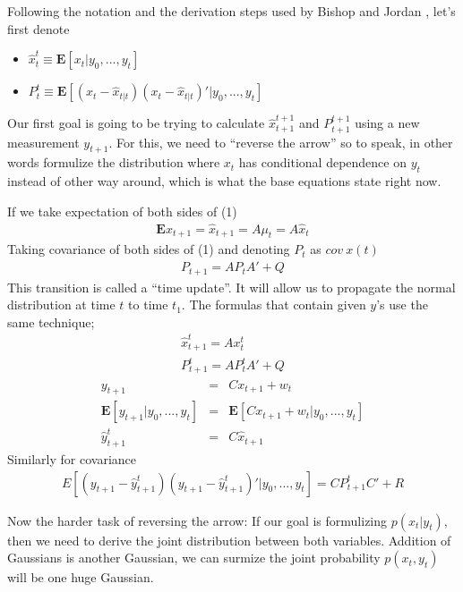Following the notation and the derivation steps used by Bishop and Jordan
\cite{jordan}, let's first denote

\begin{itemize}
   \item $\hat{x}_{t}^t \equiv \mathbf{E}[x_t|y_0,...,y_t]$
   \item $P_{t}^t \equiv \mathbf{E}[(x_t - \hat{x}_{t|t})(x_t -
   \hat{x}_{t|t})'|y_0,...,y_t]$ 
\end{itemize}
Our first goal is going to be trying to calculate $\hat{x}_{t+1}^{t+1}$ and
$P_{t+1}^{t+1}$ using a new measurement $y_{t+1}$. For this, we need to
``reverse the arrow'' so to speak, in other words formulize the distribution
where $x_t$ has conditional dependence on $y_t$ instead of other way around,
which is what the base equations state right now.

If we take expectation of both sides of (1)
\begin{eqnarray*}
\mathbf{E}x_{t+1} = \hat{x}_{t+1} = A\mu_t = A\hat{x}_t
\end{eqnarray*}
Taking covariance of both sides of (1) and denoting $P_t$ as $cov \: x(t)$
\begin{eqnarray*}
P_{t+1} = AP_{t}A' + Q
\end{eqnarray*}
This transition is called a ``time update''. It will allow us to propagate the
normal distribution at time $t$ to time $t_1$. The formulas that contain given
$y$'s use the same technique;
\begin{eqnarray*}
\hat{x}_{t+1}^t = Ax_{t}^t\\
P_{t+1}^t = AP_{t}^tA' + Q
\end{eqnarray*}
\begin{eqnarray*}
y_{t+1} &=& Cx_{t+1} + w_t\\
\mathbf{E}[y_{t+1}|y_0,...,y_t] &=& \mathbf{E}[Cx_{t+1}+w_t|y_0,...,y_t]\\
\hat{y}_{t+1}^t &=& C\hat{x}_{t+1}
\end{eqnarray*}
Similarly for covariance
\begin{eqnarray*}
E[(y_{t+1}-\hat{y}_{t+1}^t)(y_{t+1}-\hat{y}_{t+1}^t)'|y_0,...,y_t] =
CP_{t+1}^tC' + R
\end{eqnarray*}

Now the harder task of reversing the arrow: If our goal is formulizing
$p(x_t|y_t)$, then we need to derive the joint distribution between both
variables. Addition of Gaussians is another Gaussian, we can surmize the joint
probability $p(x_t,y_t)$ will be one huge Gaussian.

